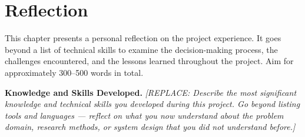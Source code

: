 
\chapter{Reflection}
\label{ch:reflection}

This chapter presents a personal reflection on the project experience. It goes 
beyond a list of technical skills to examine the decision-making process, the 
challenges encountered, and the lessons learned throughout the project. 
Aim for approximately 300--500 words in total.


\noindent\textbf{Knowledge and Skills Developed.}
\textit{[REPLACE: Describe the most significant knowledge and technical skills 
you developed during this project. Go beyond listing tools and languages — 
reflect on what you now understand about the problem domain, research methods, 
or system design that you did not understand before.]}

